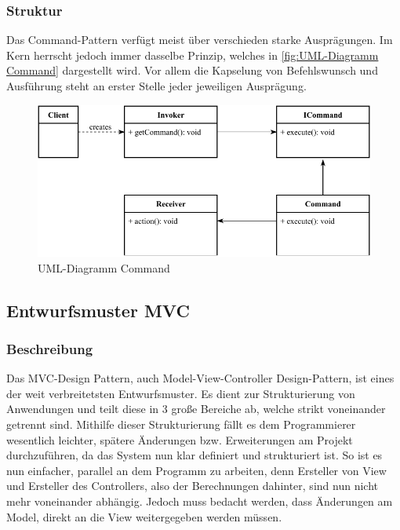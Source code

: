 \subsubsection{Struktur}
Das Command-Pattern verfügt meist über verschieden starke Ausprägungen.
Im Kern herrscht jedoch immer dasselbe Prinzip, welches in \autoref{fig:UML-Diagramm Command} dargestellt wird.
Vor allem die Kapselung von Befehlswunsch und Ausführung steht an erster Stelle jeder jeweiligen Ausprägung.
\begin{figure}[H]
    \centering
    \includegraphics[width=1\textwidth]{fig/ainf/Command.pdf}
    \caption{UML-Diagramm Command}
    \label{fig:UML-Diagramm Command}
\end{figure}
\subsection{Entwurfsmuster \acs{MVC}}\label{subsec:entwurfsmuster-mvc}
\subsubsection{Beschreibung}
Das MVC-Design Pattern, auch Model-View-Controller Design-Pattern, ist eines der weit verbreitetsten Entwurfsmuster.
Es dient zur Strukturierung von Anwendungen und teilt diese in 3 große Bereiche ab, welche strikt voneinander getrennt sind.
Mithilfe dieser Strukturierung fällt es dem Programmierer wesentlich leichter, spätere Änderungen bzw. Erweiterungen am Projekt durchzuführen, da das System nun klar definiert und strukturiert ist.
So ist es nun einfacher, parallel an dem Programm zu arbeiten, denn Ersteller von View und Ersteller des Controllers, also der Berechnungen dahinter, sind nun nicht mehr voneinander abhängig.
Jedoch muss bedacht werden, dass Änderungen am Model, direkt an die View weitergegeben werden müssen.
\newpage
